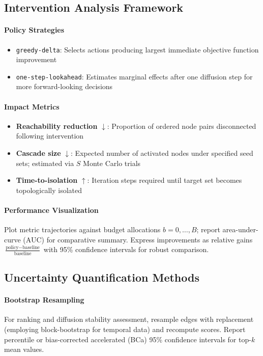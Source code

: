 \documentclass[12pt]{article}
\theoremstyle{plain}
\begin{document}
\subsection{Intervention Analysis Framework}
\paragraph{Policy Strategies}
\begin{itemize}\itemsep0.2em
\item \texttt{greedy-delta}: Selects actions producing largest immediate objective function improvement
\item \texttt{one-step-lookahead}: Estimates marginal effects after one diffusion step for more forward-looking decisions
\end{itemize}

\paragraph{Impact Metrics} 
\begin{itemize}\itemsep0.2em
\item \textbf{Reachability reduction} $\downarrow$: Proportion of ordered node pairs disconnected following intervention
\item \textbf{Cascade size} $\downarrow$: Expected number of activated nodes under specified seed sets; estimated via $S$ Monte Carlo trials
\item \textbf{Time-to-isolation} $\uparrow$: Iteration steps required until target set becomes topologically isolated
\end{itemize}

\paragraph{Performance Visualization}
Plot metric trajectories against budget allocations $b=0,\dots,B$; report area-under-curve (AUC) for comparative summary. Express improvements as relative gains $\frac{\text{policy} - \text{baseline}}{\text{baseline}}$ with 95\% confidence intervals for robust comparison.

\subsection{Uncertainty Quantification Methods}
\paragraph{Bootstrap Resampling}
For ranking and diffusion stability assessment, resample edges with replacement (employing block-bootstrap for temporal data) and recompute scores. Report percentile or bias-corrected accelerated (BCa) 95\% confidence intervals for top-$k$ mean values.
\end{document}
